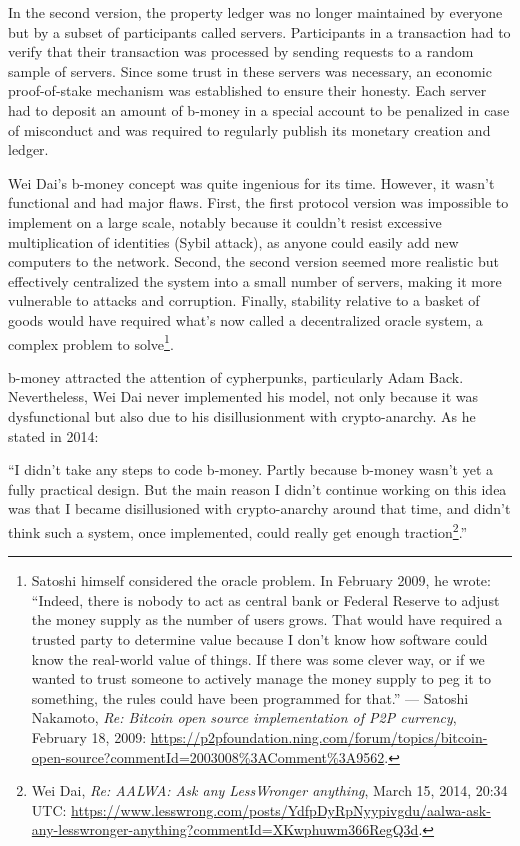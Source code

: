 \documentclass[
  a5paper,
  smalldemyvopaper,10pt,twoside,onecolumn,openright,extrafontsizes,hidelinks]{memoir}
\begin{document}
In the second version, the property ledger was no longer maintained by
everyone but by a subset of participants called servers. Participants in
a transaction had to verify that their transaction was processed by
sending requests to a random sample of servers. Since some trust in
these servers was necessary, an economic proof-of-stake mechanism was
established to ensure their honesty. Each server had to deposit an
amount of b-money in a special account to be penalized in case of
misconduct and was required to regularly publish its monetary creation
and ledger.

Wei Dai's b-money concept was quite ingenious for its time. However, it
wasn't functional and had major flaws. First, the first protocol version
was impossible to implement on a large scale, notably because it
couldn't resist excessive multiplication of identities (Sybil attack),
as anyone could easily add new computers to the network. Second, the
second version seemed more realistic but effectively centralized the
system into a small number of servers, making it more vulnerable to
attacks and corruption. Finally, stability relative to a basket of goods
would have required what's now called a decentralized oracle system, a
complex problem to solve\footnote{Satoshi himself considered the oracle
  problem. In February 2009, he wrote: ``Indeed, there is nobody to act
  as central bank or Federal Reserve to adjust the money supply as the
  number of users grows. That would have required a trusted party to
  determine value because I don't know how software could know the
  real-world value of things. If there was some clever way, or if we
  wanted to trust someone to actively manage the money supply to peg it
  to something, the rules could have been programmed for that.'' ---
  Satoshi Nakamoto, \emph{Re: Bitcoin open source implementation of P2P
  currency}, February 18, 2009:
  \url{https://p2pfoundation.ning.com/forum/topics/bitcoin-open-source?commentId=2003008\%3AComment\%3A9562}.}.

b-money attracted the attention of cypherpunks, particularly Adam Back.
Nevertheless, Wei Dai never implemented his model, not only because it
was dysfunctional but also due to his disillusionment with
crypto-anarchy. As he stated in 2014:

``I didn't take any steps to code b-money. Partly because b-money wasn't
yet a fully practical design. But the main reason I didn't continue
working on this idea was that I became disillusioned with crypto-anarchy
around that time, and didn't think such a system, once implemented,
could really get enough traction\footnote{Wei Dai, \emph{Re: AALWA: Ask
  any LessWronger anything}, March 15, 2014, 20:34 UTC:
  \url{https://www.lesswrong.com/posts/YdfpDyRpNyypivgdu/aalwa-ask-any-lesswronger-anything?commentId=XKwphuwm366RegQ3d}.}.''
\end{document}
